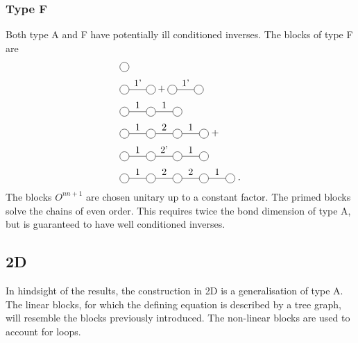 \documentclass[twocolumn]{article}
\newcounter{a}
\newcounter{b}
\begin{document}
\subsubsection{Type F}
Both type A and F have potentially ill conditioned inverses. The blocks of type F are
\begin{subequations}
    \begin{align}
         & \mpob{1}{ {,}  }{}{}{}{{,,}}                                          \\
         & \mpob{2}{ {,"1'",}  }{}{}{}{{,,}}+  \mpob{2}{ {,"1'",}  }{}{}{}{{,,}} \\
         & \mpob{3}{ {,"1","1",}  }{}{}{}{{,,,}}                                 \\
         & \mpob{4}{ {,"1","2","1",}  }{}{}{}{{,,,,,}} \; +  \nonumber           \\
         & \mpob{4}{ {,"1","2'","1",}  }{}{}{}{{,,,,,}}                          \\
         & \mpob{5}{ {,"1","2","2","1",}  }{}{}{}{{,,,,,}} \;.
    \end{align}
\end{subequations}
The blocks $O^{n n+1}$ are chosen unitary up to a constant factor. The primed blocks solve the chains of even order. This requires twice the bond dimension of type A, but is guaranteed to have well conditioned inverses.

\subsection{2D}
In hindsight of the results, the construction in 2D is a generalisation of type A. The linear blocks, for which the defining equation is described by a tree graph, will resemble the blocks previously introduced. The non-linear blocks are used to account for loops.
\end{document}
